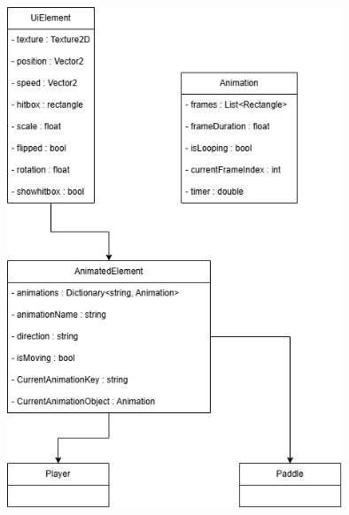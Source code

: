 \documentclass[french]{article}
\begin{document}
\begin{center}
    \vspace{1cm} %
    \includegraphics[width=10cm]{../Diagrammes/classes.png}
    \vspace{1cm} %
\end{center}








\end{document}
